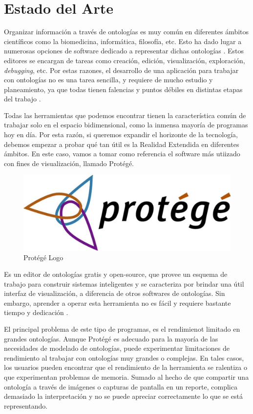 \clearemptydoublepage
\chapter{Estado del Arte}

Organizar información a través de ontologías es muy común en diferentes ámbitos científicos como la biomedicina, informática, filosofía, etc.
Esto ha dado lugar a numerosas opciones de software dedicado a representar dichas ontologías \cite[]{ontologyEditors}. Estos editores se encargan de tareas como creación,
edición, visualización, exploración, \textit{debugging}, etc. Por estas razones, el desarrollo de una aplicación para trabajar con ontologías no es
una tarea sencilla, y requiere de mucho estudio y planeamiento, ya que todas tienen falencias y puntos débiles en distintas etapas del trabajo \cite[]{ontologyIssues}.

Todas las herramientas que podemos encontrar tienen la característica común de trabajar solo en el espacio bidimensional, como la inmensa mayoría de programas hoy en día.
Por esta razón, si queremos expandir el horizonte de la tecnología, debemos empezar a probar qué tan útil es la Realidad Extendida en diferentes ámbitos. En este caso,
vamos a tomar como referencia el software más utiizado con fines de visualización, llamado Protégé.

\begin{figure}[ht]
   \begin{center}
      \includegraphics[width=0.7\linewidth]{chapter1/figures/protege.jpg}
   \end{center}
   \caption[Protégé Logo]
   {\footnotesize Protégé Logo}
   \label{fig:mufigure3}
\end{figure}

Es un editor de ontologías gratis y open-source, que provee un esquema de trabajo para construir sistemas inteligentes y se caracteriza
por brindar una útil interfaz de visualización, a diferencia de otros softwares de ontologías. Sin embargo, aprender a operar esta herramienta no es fácil
y requiere bastante tiempo y dedicación \cite[]{ontologyTutorial}.

El principal problema de este tipo de programas, es el rendimienot limitado en grandes ontologías. Aunque Protégé es adecuado para la mayoría de las necesidades de modelado de ontologías, puede experimentar limitaciones de rendimiento al trabajar con ontologías muy grandes o complejas. En tales casos, los usuarios pueden encontrar que el rendimiento de la herramienta se ralentiza o que experimentan problemas de memoria.
Sumado al hecho de que compartir una ontología a través de imágenes o capturas de pantalla en un reporte, complica demasiado la interpretación y no se puede apreciar correctamente lo que se está representando.